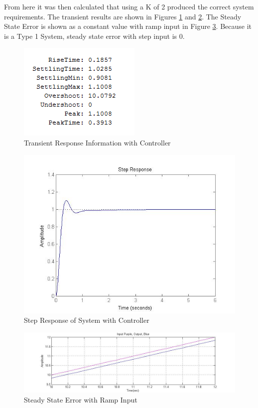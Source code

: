 \documentclass[12pt,letter]{article}
\begin{document}
\noindent From here it was then calculated that using a K of 2 produced the correct system requirements. The transient results are shown in Figures \ref{fig:controlledinfo} and \ref{fig:controlledsystem}. The Steady State Error is shown as a constant value with ramp input in Figure \ref{fig:rampstst}. Because it is a Type 1 System, steady state error with step input is 0.
\begin{figure}[H]
\centering
\includegraphics[width=.5\linewidth]{controlledinfo}
\caption{Transient Response Information with Controller}
\label{fig:controlledinfo}
\end{figure}

\begin{figure}[H]
\centering
\includegraphics[width=1\linewidth]{controlledsystem}
\caption{Step Response of System with Controller}
\label{fig:controlledsystem}
\end{figure}


\begin{figure}[H]
\centering
\includegraphics[width=1\linewidth]{rampsteadystateerror}
\caption{Steady State Error with Ramp Input}
\label{fig:rampstst}
\end{figure}
\end{document}
